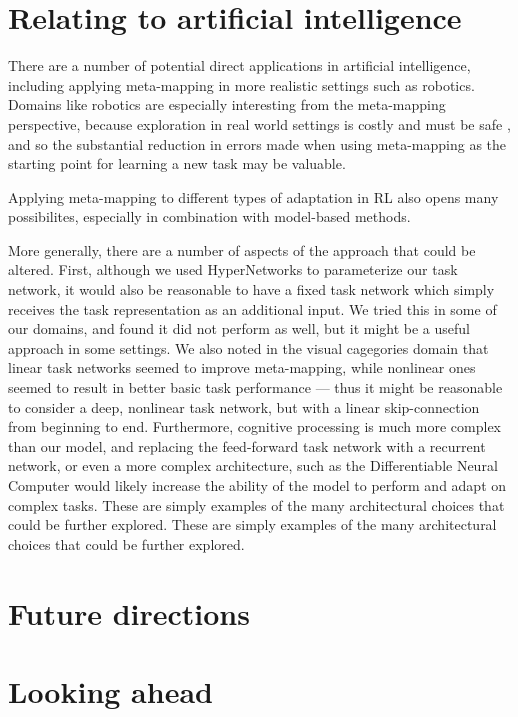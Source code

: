 \section{Relating to artificial intelligence}

There are a number of potential direct applications in artificial intelligence, including applying meta-mapping in more realistic settings such as robotics. Domains like robotics are especially interesting from the meta-mapping perspective, because exploration in real world settings is costly and must be safe \citep{Turchetta2016}, and so the substantial reduction in errors made when using meta-mapping as the starting point for learning a new task may be valuable. \par 

Applying meta-mapping to different types of adaptation in RL also opens many possibilites, especially in combination with model-based methods. 

More generally, there are a number of aspects of the approach that could be altered. First, although we used HyperNetworks to parameterize our task network, it would also be reasonable to have a fixed task network which simply receives the task representation as an additional input. We tried this in some of our domains, and found it did not perform as well, but it might be a useful approach in some settings. We also noted in the visual cagegories domain that linear task networks seemed to improve meta-mapping, while nonlinear ones seemed to result in better basic task performance --- thus it might be reasonable to consider a deep, nonlinear task network, but with a linear skip-connection from beginning to end. Furthermore, cognitive processing is much more complex than our model, and replacing the feed-forward task network with a recurrent network, or even a more complex architecture, such as the Differentiable Neural Computer \citep{Graves2016} would likely increase the ability of the model to perform and adapt on complex tasks. These are simply examples of the many architectural choices that could be further explored. These are simply examples of the many architectural choices that could be further explored. \par


\section{Future directions}





\section{Looking ahead}


